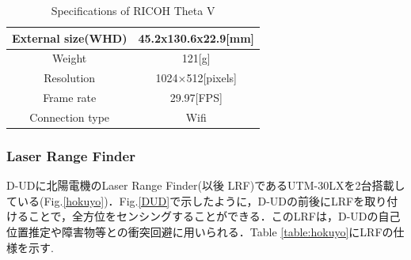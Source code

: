 \documentclass[12pt]{sonota/aislab}
\begin{document}
\begin{table}[h]
	\caption{Specifications of RICOH Theta V}
	\label{table:ThetaV_TABLE}
	\centering 
	\begin{tabular}[tbp]{|c|c|}
		\hline 
		External size(WHD) & 45.2x130.6x22.9[mm] \\\hline
		Weight & 121[g] \\\hline
		Resolution & 1024×512[pixels] \\\hline
		Frame rate & 29.97[FPS] \\\hline
		Connection type & Wifi \\\hline
	\end{tabular}
\end{table}

\subsubsection{Laser Range Finder}
D-UDに北陽電機のLaser Range Finder(以後 LRF)であるUTM-30LXを2台搭載している(Fig.\ref{hokuyo})．Fig.\ref{DUD}で示したように，D-UDの前後にLRFを取り付けることで，全方位をセンシングすることができる．このLRFは，D-UDの自己位置推定や障害物等との衝突回避に用いられる．Table \ref{table:hokuyo}にLRFの仕様を示す.

\end{document}
